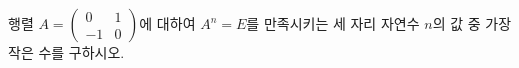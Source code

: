 \hspace*{2mm}\begin{minipage}[t]{\dimexpr\linewidth-2mm\relax}\vspace{0pt}
행렬 $A=\begin{pmatrix} 0 & 1 \\ -1 & 0 \end{pmatrix}$에 대하여 $A^n=E$를 만족시키는 세 자리 자연수 $n$의 값 중 가장 작은 수를 구하시오. \end{minipage}
